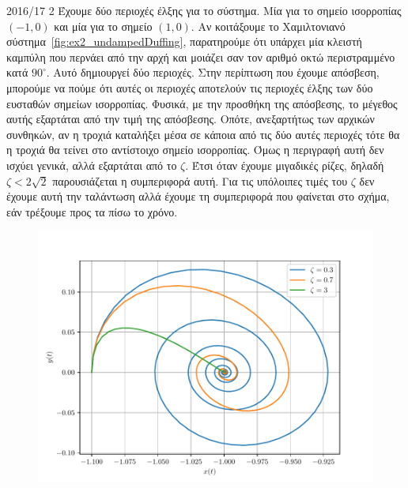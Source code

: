 \begin{solution}{2016/17 2}
    Έχουμε δύο περιοχές έλξης για το σύστημα. Μία για το σημείο ισορροπίας
    \( (-1, 0) \) και μία για το σημείο \( (1, 0) \). Αν κοιτάξουμε το
    Χαμιλτονιανό σύστημα~\ref{fig:ex2_undampedDuffing}, παρατηρούμε ότι υπάρχει
    μία κλειστή καμπύλη που περνάει από την αρχή και μοιάζει σαν τον αριθμό οκτώ
    περιστραμμένο κατά \( 90^{\circ} \). Αυτό δημιουργεί δύο περιοχές. Στην
    περίπτωση που έχουμε απόσβεση, μπορούμε να πούμε ότι αυτές οι περιοχές
    αποτελούν τις περιοχές έλξης των δύο ευσταθών σημείων ισορροπίας. Φυσικά, με
    την προσθήκη της απόσβεσης, το μέγεθος αυτής εξαρτάται από την τιμή της
    απόσβεσης. Οπότε, ανεξαρτήτως των αρχικών συνθηκών, αν η τροχιά καταλήξει
    μέσα σε κάποια από τις δύο αυτές περιοχές τότε θα η τροχιά θα τείνει στο
    αντίστοιχο σημείο ισορροπίας. Όμως η περιγραφή αυτή δεν ισχύει γενικά, αλλά
    εξαρτάται από το \( \zeta \). Έτσι όταν έχουμε μιγαδικές ρίζες, δηλαδή \(
    \zeta < 2\sqrt{2} \) παρουσιάζεται η συμπεριφορά αυτή. Για τις υπόλοιπες τιμές
    του \( \zeta \) δεν έχουμε αυτή την ταλάντωση αλλά έχουμε τη συμπεριφορά που
    φαίνεται στο σχήμα, εάν τρέξουμε προς τα πίσω το χρόνο.
    \begin{figure}[h!]
        \centering
        \includegraphics[width=1\textwidth]{figures/ex2_attractors.pdf}
        \caption{}
        \label{fig:ex2_attractors}
    \end{figure}


\end{solution}
